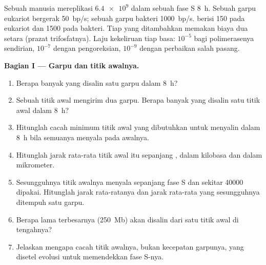 \begin{problem}
\label{pb:b1:replication-mitosis:1}
Sebuah  manusia mereplikasi $\num{6.4e9}$  dalam sebuah
fase S \qty{8}{h}. Sebuah garpu eukariot bergerak \qty{50}{bp/s};
sebuah garpu bakteri \qty{1000}{bp/s}.  berisi
\qty{150}{}  pada eukariot dan \qty{1500}{} pada bakteri.
Tiap  yang ditambahkan memakan biaya dua setara  (prazat
trifosfatnya). Laju kekeliruan tiap basa: $10^{-5}$ bagi polimerasenya
sendirian, $10^{-7}$ dengan pengoreksian, $10^{-9}$ dengan perbaikan
salah pasang.

\medskip
\noindent\textbf{Bagian I --- Garpu dan titik awalnya.}
\begin{enumerate}
  \item Berapa banyak  yang disalin satu garpu dalam
        \qty{8}{h}?
  \item Sebuah titik awal mengirim dua garpu. Berapa banyak  yang disalin satu titik awal dalam \qty{8}{h}?
  \item Hitunglah cacah minimum titik awal yang dibutuhkan untuk
        menyalin  dalam \qty{8}{h} bila semuanya menyala pada
        awalnya.
  \item Hitunglah jarak rata-rata titik awal itu sepanjang ,
        dalam kilobasa dan dalam mikrometer.
  \item Sesungguhnya titik awalnya menyala sepanjang fase S dan sekitar
        \num{40000} dipakai. Hitunglah jarak rata-ratanya dan jarak
        rata-rata yang sesungguhnya ditempuh satu garpu.
  \item Berapa lama  terbesarnya (\qty{250}{Mb}) akan disalin
        dari satu titik awal di tengahnya?
  \item Jelaskan mengapa cacah titik awalnya, bukan kecepatan garpunya,
        yang disetel evolusi untuk memendekkan fase S-nya.
\end{enumerate}


\end{problem}

